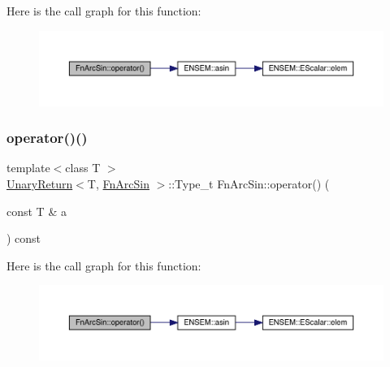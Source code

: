 Here is the call graph for this function\+:
\nopagebreak
\begin{figure}[H]
\begin{center}
\leavevmode
\includegraphics[width=350pt]{d3/d85/structFnArcSin_a12cc5b8e1ae14e2bdb4a9ec3be431874_cgraph}
\end{center}
\end{figure}
\mbox{\label{structFnArcSin_a12cc5b8e1ae14e2bdb4a9ec3be431874}} 
\subsubsection{\texorpdfstring{operator()()}{operator()()}\hspace{0.1cm}{\footnotesize\ttfamily [2/3]}}
{\footnotesize\ttfamily template$<$class T $>$ \\
\mbox{\hyperlink{structUnaryReturn}{Unary\+Return}}$<$T, \mbox{\hyperlink{structFnArcSin}{Fn\+Arc\+Sin}} $>$\+::Type\+\_\+t Fn\+Arc\+Sin\+::operator() (\begin{DoxyParamCaption}\item[{const T \&}]{a }\end{DoxyParamCaption}) const\hspace{0.3cm}{\ttfamily [inline]}}

Here is the call graph for this function\+:
\nopagebreak
\begin{figure}[H]
\begin{center}
\leavevmode
\includegraphics[width=350pt]{d3/d85/structFnArcSin_a12cc5b8e1ae14e2bdb4a9ec3be431874_cgraph}
\end{center}
\end{figure}
\mbox{\label{structFnArcSin_a12cc5b8e1ae14e2bdb4a9ec3be431874}} 
